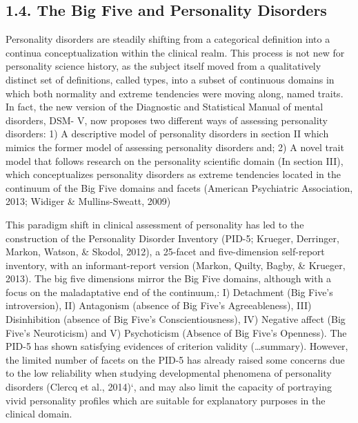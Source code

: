 \documentclass[man]{apa6}
\theoremstyle{definition}
\theoremstyle{definition}
\theoremstyle{definition}
\theoremstyle{remark}
\begin{document}
\hypertarget{the-big-five-and-personality-disorders}{%
\subsection{1.4. The Big Five and Personality
Disorders}\label{the-big-five-and-personality-disorders}}

Personality disorders are steadily shifting from a categorical
definition into a continua conceptualization within the clinical realm.
This process is not new for personality science history, as the subject
itself moved from a qualitatively distinct set of definitions, called
types, into a subset of continuous domains in which both normality and
extreme tendencies were moving along, named traits. In fact, the new
version of the Diagnostic and Statistical Manual of mental disorders,
DSM- V, now proposes two different ways of assessing personality
disorders: 1) A descriptive model of personality disorders in section II
which mimics the former model of assessing personality disorders and; 2)
A novel trait model that follows research on the personality scientific
domain (In section III), which conceptualizes personality disorders as
extreme tendencies located in the continuum of the Big Five domains and
facets (American Psychiatric Association, 2013; Widiger \&
Mullins-Sweatt, 2009)

This paradigm shift in clinical assessment of personality has led to the
construction of the Personality Disorder Inventory (PID-5; Krueger,
Derringer, Markon, Watson, \& Skodol, 2012), a 25-facet and
five-dimension self-report inventory, with an informant-report version
(Markon, Quilty, Bagby, \& Krueger, 2013). The big five dimensions
mirror the Big Five domains, although with a focus on the maladaptative
end of the continuum,: I) Detachment (Big Five's introversion), II)
Antagonism (absence of Big Five's Agreeableness), III) Disinhibition
(absence of Big Five's Conscientiousness), IV) Negative affect (Big
Five's Neuroticism) and V) Psychoticism (Absence of Big Five's
Openness). The PID-5 has shown satisfying evidences of criterion
validity (\ldots{}summary). However, the limited number of facets on the
PID-5 has already raised some concerns due to the low reliability when
studying developmental phenomena of personality disorders (Clercq et
al., 2014)`, and may also limit the capacity of portraying vivid
personality profiles which are suitable for explanatory purposes in the
clinical domain.
\end{document}
